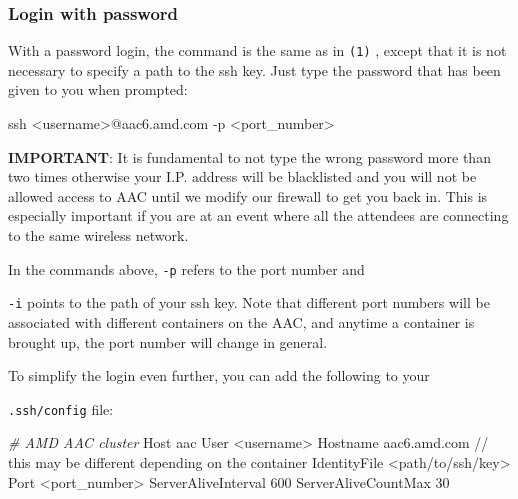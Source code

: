 \documentclass[
]{article}
\let\oldtexttt\texttt
\renewcommand{\texttt}[1]{
  \colorbox{Light}{\oldtexttt{#1}}
}
\newenvironment{Shaded}{}{}
\newcommand{\CommentTok}[1]{\textcolor[rgb]{0.38,0.63,0.69}{\textit{#1}}}
\newcommand{\ExtensionTok}[1]{#1}
\newcommand{\FunctionTok}[1]{\textcolor[rgb]{0.02,0.16,0.49}{#1}}
\newcommand{\NormalTok}[1]{#1}
\newcommand{\OperatorTok}[1]{\textcolor[rgb]{0.40,0.40,0.40}{#1}}
\begin{document}
\hypertarget{login-with-password}{%
\subsubsection{Login with password}\label{login-with-password}}

With a password login, the command is the same as in \texttt{(1)}, except that it is not
necessary to specify a path to the ssh key. Just type the password that
has been given to you when prompted:

\begin{Shaded}
\begin{Highlighting}[]
\FunctionTok{ssh} \OperatorTok{\textless{}}\NormalTok{username}\OperatorTok{\textgreater{}}\NormalTok{@aac6.amd.com {-}p }\OperatorTok{\textless{}}\NormalTok{port\_number}\OperatorTok{\textgreater{}}
\end{Highlighting}
\end{Shaded}

\textbf{IMPORTANT}: It is fundamental to not type the wrong password
more than two times otherwise your I.P. address will be blacklisted and
you will not be allowed access to AAC until we modify our firewall to
get you back in. This is especially important if you are at an event
where all the attendees are connecting to the same wireless network.

In the commands above, \texttt{-p} refers to the port number and
\texttt{-i} points to the path of your ssh key. Note that different port
numbers will be associated with different containers on the AAC, and
anytime a container is brought up, the port number will change in
general.

To simplify the login even further, you can add the following to your
\texttt{.ssh/config} file:

\begin{Shaded}
\begin{Highlighting}[]
\CommentTok{\# AMD AAC cluster}
\ExtensionTok{Host}\NormalTok{ aac}
   \ExtensionTok{User} \OperatorTok{\textless{}}\NormalTok{username}\OperatorTok{\textgreater{}}
   \ExtensionTok{Hostname}\NormalTok{ aac6.amd.com // this may be different depending on the container}
   \ExtensionTok{IdentityFile} \OperatorTok{\textless{}}\NormalTok{path/to/ssh/key}\OperatorTok{\textgreater{}}
   \ExtensionTok{Port} \OperatorTok{\textless{}}\NormalTok{port\_number}\OperatorTok{\textgreater{}}
   \ExtensionTok{ServerAliveInterval}\NormalTok{ 600}
   \ExtensionTok{ServerAliveCountMax}\NormalTok{ 30}
\end{Highlighting}
\end{Shaded}
\end{document}
